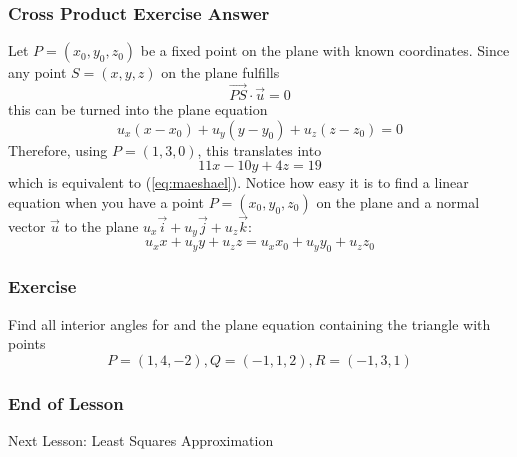 \documentclass[xcolor=dvipsnames]{beamer}
\begin{document}
\begin{frame}
  \frametitle{Cross Product Exercise Answer}
  Let $P=(x_{0},y_{0},z_{0})$ be a fixed point on the plane with known
  coordinates. Since any point $S=(x,y,z)$ on the plane fulfills
\begin{equation}
  \label{eq:iefeeboh}
  \vec{PS}\cdot\vec{u}=0
\end{equation}
this can be turned into the plane equation
\begin{equation}
  \label{eq:vetiexup}
  u_{x}(x-x_{0})+u_{y}(y-y_{0})+u_{z}(z-z_{0})=0
\end{equation}
Therefore, using $P=(1,3,0)$, this translates into
\begin{equation}
  \label{eq:eechawoi}
11x-10y+4z=19  
\end{equation}
which is equivalent to (\ref{eq:maeshael}). Notice how easy it is to
find a linear equation when you have a point $P=(x_{0},y_{0},z_{0})$
on the plane and a normal vector $\vec{u}$ to the plane
$u_{x}\vec{i}+u_{y}\vec{j}+u_{z}\vec{k}$:
\begin{equation}
  \label{eq:quaghoob}
u_{x}x+u_{y}y+u_{z}z=u_{x}x_{0}+u_{y}y_{0}+u_{z}z_{0}
\end{equation}
\end{frame}

\begin{frame}
  \frametitle{Exercise}
  {\ubung} Find all interior angles for and the plane equation
  containing the triangle with points
  \begin{equation}
    \label{eq:yeibieba}
    P=(1,4,-2),Q=(-1,1,2),R=(-1,3,1)
  \end{equation}
\end{frame}

\begin{frame}
  \frametitle{End of Lesson}
Next Lesson: Least Squares Approximation
\end{frame}
\end{document}
